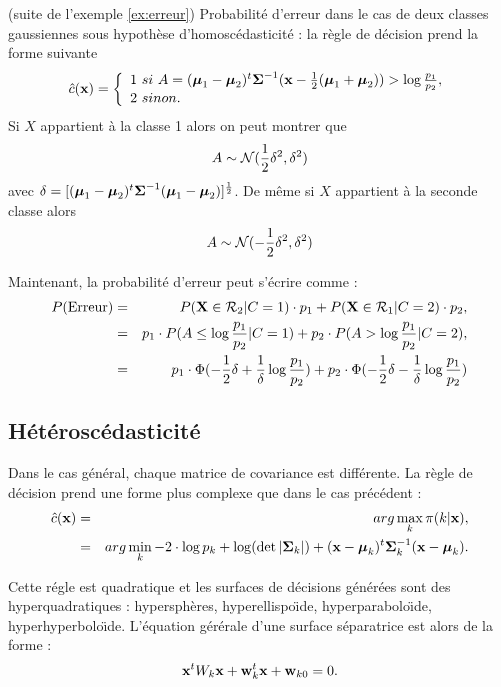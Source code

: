 \begin{ex}\cite{Ripley1996}(suite de l'exemple \ref{ex:erreur})
Probabilit\'e d'erreur dans le cas de deux classes gaussiennes sous hypoth\`ese d'homosc\'edasticit\'e :
la r\`egle de d\'ecision prend la forme suivante
$$
\hat{c}(\mbox{\bf x})=
\left \{ \begin{array}{l}
1 \ si \ A=(\mbox{\boldmath $\mu$}_1 - \mbox{\boldmath $\mu$}_2)^t \mbox{\boldmath $\Sigma$}^{-1}(\mbox{\bf x} - \frac{1}{2}(\mbox{\boldmath $\mu$}_1 + \mbox{\boldmath $\mu$}_2)) > \log \frac{p_1}{p_2} , \\
2 \ sinon.\\
\end{array}
\right .
$$
Si $X$ appartient \`a la classe 1 alors on peut montrer que
$$
A \sim {\cal N}(\frac{1}{2}\delta^2,\delta^2)
$$
avec $\delta=[(\mbox{\boldmath $\mu$}_1 - \mbox{\boldmath $\mu$}_2)^t \mbox{\boldmath $\Sigma$}^{-1} (\mbox{\boldmath $\mu$}_1 - \mbox{\boldmath $\mu$}_2)]^{\frac{1}{2}}$.
De m\^eme si $X$ appartient \`a la seconde classe alors 
$$
A \sim {\cal N}(-\frac{1}{2}\delta^2,\delta^2)
$$

Maintenant,  la probabilit\'e d'erreur peut s'\'ecrire comme : 
\begin{eqnarray*}
P(\mbox{Erreur})& = &  P(\mbox{\bf X} \in {\cal R}_2 | C=1) \cdot p_1 +  
P(\mbox{\bf X} \in {\cal R}_1 | C=2) \cdot p_2,\\
& = &  p_1 \cdot P(A\leq \log \frac{p_1}{p_2}| C=1) + p_2 \cdot  P(A > \log \frac{p_1}{p_2}| C=2),\\
                & = &  p_1 \cdot \Phi(-\frac{1}{2} \delta + \frac{1}{\delta} \log \frac{p_1}{p_2}) + p_2 \cdot \Phi(-\frac{1}{2} \delta - \frac{1}{\delta} \log \frac{p_1}{p_2})
\end{eqnarray*}


\end{ex}






\subsection{H\'et\'erosc\'edasticit\'e}
Dans le cas g\'en\'eral, chaque matrice de covariance est diff\'erente. 
La r\`egle de d\'ecision prend une forme plus complexe que dans le cas
pr\'ec\'edent :
\begin{eqnarray*}
\hat{c}(\mbox{\bf x}) & = & arg \max_k \pi (k | \mbox{\bf x} ),\\
            & = & arg \min_k -2 \cdot \log p_k  + \log(\det{|\mbox{\boldmath $\Sigma$}_k|}) + (\mbox{\bf x} - \mbox{\boldmath $\mu$}_k)^t \mbox{\boldmath $\Sigma$}_k^{-1} (\mbox{\bf x} - \mbox{\boldmath $\mu$}_k).
\end{eqnarray*}

Cette r\'egle est quadratique et les surfaces de d\'ecisions g\'en\'er\'ees
sont des hyperquadratiques : hypersph\`eres, hyperellispo\"{\i}de, 
hyperparabolo\"{\i}de, hyperhyperbolo\"{\i}de. L'\'equation g\'er\'erale
d'une  surface s\'eparatrice est alors de la forme :
$$
\mbox{\bf x}^t W_k \mbox{\bf x} + \mbox{\bf w}_k^t \mbox{\bf x} + \mbox{\bf w}_{k0}=0. 
$$  


